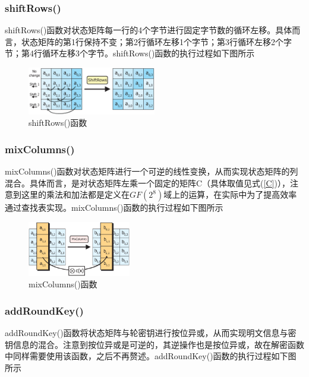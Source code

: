 \subsubsection{shiftRows()}

shiftRows()函数对状态矩阵每一行的4个字节进行固定字节数的循环左移。具体而言，状态矩阵的第1行保持不变；第2行循环左移1个字节；第3行循环左移2个字节；第4行循环左移3个字节。shiftRows()函数的执行过程如下图所示

\begin{figure}[h]
    \centering
    \includegraphics[width=0.5\textwidth,trim=0 30 0 10,clip]{./pic/shiftRows.eps}
    \caption{shiftRows()函数}
\end{figure}

\subsubsection{mixColumns()}

mixColumns()函数对状态矩阵进行一个可逆的线性变换，从而实现状态矩阵的列混合。具体而言，是对状态矩阵左乘一个固定的矩阵C（具体取值见式(\ref{C})），注意到这里的乘法和加法都是定义在$GF(2^8)$域上的运算，在实际中为了提高效率通过查找表实现。mixColumns()函数的执行过程如下图所示

\begin{figure}[h]
    \centering
    \includegraphics[width=0.4\textwidth,trim=0 20 0 0,clip]{./pic/mixColumns.eps}
    \caption{mixColumns()函数}
\end{figure}

\subsubsection{addRoundKey()}

addRoundKey()函数将状态矩阵与轮密钥进行按位异或，从而实现明文信息与密钥信息的混合。注意到按位异或是可逆的，其逆操作也是按位异或，故在解密函数中同样需要使用该函数，之后不再赘述。addRoundKey()函数的执行过程如下图所示

